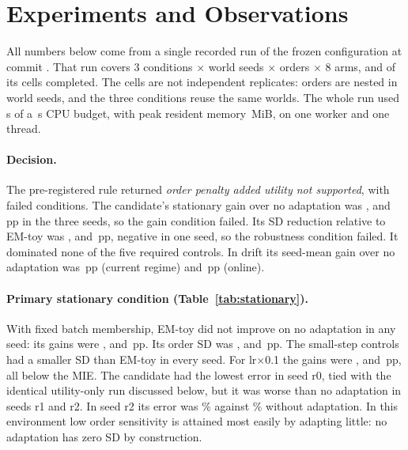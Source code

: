 \section{Experiments and Observations}
\label{sec:experiments}

All numbers below come from a single recorded run of the frozen configuration at commit
\texttt{}. That run covers $3$ conditions $\times$  world seeds $\times$
 orders $\times$ $8$ arms, and  of its  cells completed. The
cells are not independent replicates: orders are nested in world seeds, and the three conditions reuse the
same worlds. The whole run used \,s of a \,s CPU budget, with peak resident
memory \,MiB, on one worker and one thread.

\paragraph{Decision.} The pre-registered rule returned \emph{order penalty added utility not supported},
with  failed conditions. The candidate's stationary gain over no adaptation was
,  and \,pp in the three seeds, so the gain condition
failed. Its SD reduction relative to EM-toy was ,  and
\,pp, negative in one seed, so the robustness condition failed. It dominated none of the
five required controls. In drift its seed-mean gain over no adaptation was \,pp
(current regime) and \,pp (online).



\paragraph{Primary stationary condition (Table~\ref{tab:stationary}).} With fixed batch membership, EM-toy did
not improve on no adaptation in any seed: its gains were ,
 and \,pp. Its order SD was
,  and \,pp. The small-step
controls had a smaller SD than EM-toy in every seed. For lr$\times$0.1 the gains were
,  and \,pp, all below the
MIE. The candidate had the lowest error in seed r0, tied with the identical utility-only run discussed below,
but it was worse than no adaptation in seeds r1 and r2. In seed r2 its
error was \% against \% without adaptation. In this
environment low order sensitivity is attained most easily by adapting little: no adaptation has zero SD by
construction.

